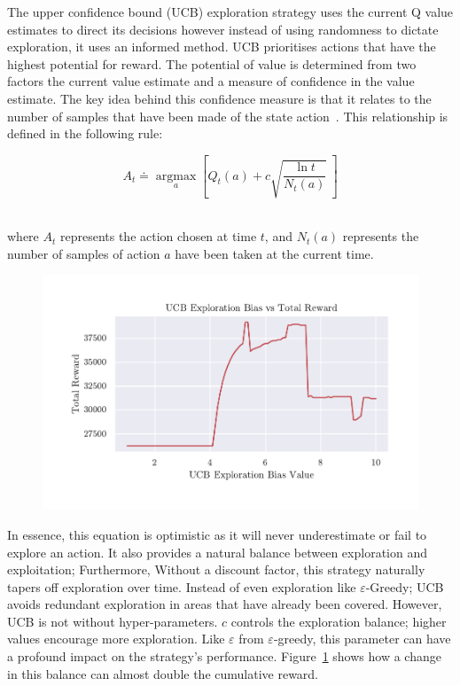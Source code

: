\documentclass[]{final_report}
\begin{document}
The upper confidence bound (UCB) exploration strategy uses the current Q value estimates to direct its decisions however instead of using randomness to dictate exploration, it uses an informed method. UCB prioritises actions that have the highest potential for reward. The potential of value is determined from two factors the current value estimate and a measure of confidence in the value estimate. The key idea behind this confidence measure is that it relates to the number of samples that have been made of the state action~\cite{sutton2018reinforcement}. This relationship is defined in the following rule:


\begin{equation}
  A_t \doteq \underset{a}{\operatorname{argmax}}\left [Q_t(a)+ c\sqrt{\frac{\ln t}{N_t(a)}} \ \right ]
  \label{eqn:ucb}
\end{equation}
~\cite{sutton2018reinforcement}

where $A_t$ represents the action chosen at time $t$, and $N_t(a)$ represents the number of samples of action $a$ have been taken at the current time. 

\begin{figure}[H]
  \centering
  
  \includegraphics[trim={0 1cm 0 1cm},clip,width=\textwidth]{hyper-paramiters/ucb-exploration}
  
  \caption{\label{fig:ucb-exploration-bias}}
\end{figure}


In essence, this equation is optimistic as it will never underestimate or fail to explore an action. It also provides a natural balance between exploration and exploitation; Furthermore, Without a discount factor, this strategy naturally tapers off exploration over time. Instead of even exploration like $\varepsilon$-Greedy; UCB avoids redundant exploration in areas that have already been covered. However, UCB is not without hyper-parameters. $c$ controls the exploration balance; higher values encourage more exploration. Like $\varepsilon$ from $\varepsilon$-greedy, this parameter can have a profound impact on the strategy's performance. Figure~\ref{fig:ucb-exploration-bias} shows how a change in this balance can almost double the cumulative reward. 
\end{document}
